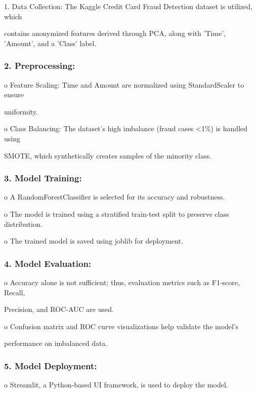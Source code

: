 \documentclass[11pt,a4paper]{article}
\begin{document}
1. Data Collection: The Kaggle Credit Card Fraud Detection dataset is utilized, which 

contains anonymized features derived through PCA, along with 'Time', 'Amount', and a 
'Class' label. 

\subsubsection*{2. Preprocessing: }

o Feature Scaling: Time and Amount are normalized using StandardScaler to ensure 

uniformity. 

o Class Balancing: The dataset’s high imbalance (fraud cases <1\%) is handled using 

\begin{center}
SMOTE, which synthetically creates samples of the minority class. 
\end{center}

\subsubsection*{3. Model Training: }

\begin{center}
o A RandomForestClassifier is selected for its accuracy and robustness. 
\end{center}

o The model is trained using a stratified train-test split to preserve class distribution. 

o The trained model is saved using joblib for deployment. 

\subsubsection*{4. Model Evaluation: }

o Accuracy alone is not sufficient; thus, evaluation metrics such as F1-score, Recall, 

Precision, and ROC-AUC are used. 

o Confusion matrix and ROC curve visualizations help validate the model's 

performance on imbalanced data. 

\subsubsection*{5. Model Deployment: }

\begin{center}
o Streamlit, a Python-based UI framework, is used to deploy the model. 
\end{center}
\end{document}
